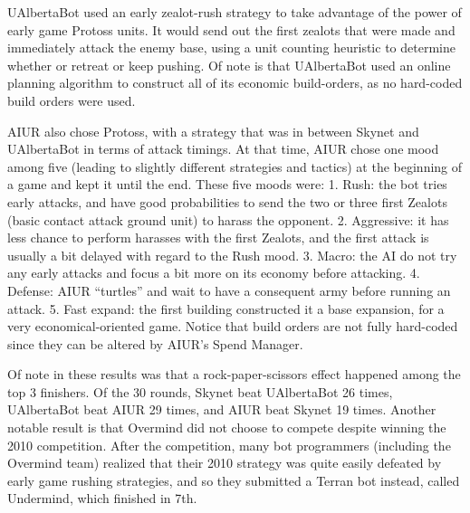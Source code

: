 \documentclass{llncs}
\begin{document}
UAlbertaBot used an early zealot-rush strategy to take advantage of the power of early game Protoss units. 
It would send out the first zealots that were made and immediately attack the enemy base, using a unit
counting heuristic to determine whether or retreat or keep pushing. Of note is that UAlbertaBot used an
online planning algorithm to construct all of its economic build-orders\cite{churchill2011build}, as no hard-coded build orders
were used. 

AIUR also chose  Protoss, with a strategy that was in between Skynet
and UAlbertaBot in terms of  attack timings.  At that time, AIUR chose
one  mood among  five (leading  to slightly  different  strategies and
tactics) at the  beginning of a game and kept it  until the end. These
five moods were: 1. Rush: the bot tries early attacks, and have good
  probabilities to send the two or three first Zealots (basic contact attack ground unit) to harass the
  opponent. 2. Aggressive: it has less chance to perform harasses with
  the first Zealots, and the first attack is usually a bit delayed
  with regard to the Rush mood. 3. Macro: the AI do not try any early attacks and focus a bit
  more on its economy before attacking. 4. Defense: AIUR  ``turtles'' and wait to have a consequent
  army before running an attack. 5. Fast expand:  the  first building  constructed it  a base
  expansion, for a very economical-oriented game. Notice that build orders are not fully hard-coded since they can be
altered by AIUR's Spend Manager.

Of  note  in  these  results  was that  a  rock-paper-scissors  effect
happened among  the top  3 finishers.  Of  the 30 rounds,  Skynet beat
UAlbertaBot 26  times, UAlbertaBot beat  AIUR 29 times, and  AIUR beat
Skynet  19 times.   Another notable  result is  that Overmind  did not
choose  to compete despite  winning the  2010 competition.   After the
competition,  many  bot  programmers  (including  the  Overmind  team)
realized that their  2010 strategy was quite easily  defeated by early
game rushing strategies,  and so they submitted a  Terran bot instead,
called Undermind, which finished in 7th.

\end{document}
